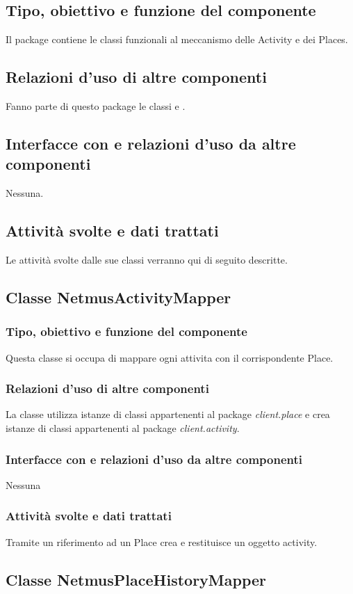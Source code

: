 \subsection*{Tipo, obiettivo e funzione del componente}
Il package contiene le classi funzionali al meccanismo delle Activity e dei
Places.
\subsection*{Relazioni d'uso di altre componenti}
Fanno parte di questo package le classi  e
.
\subsection*{Interfacce con e relazioni d'uso da altre componenti}
Nessuna.
\subsection*{Attivit\`a svolte e dati trattati}
Le attivit\`a svolte dalle sue classi verranno qui di seguito descritte.

\subsection{Classe NetmusActivityMapper}
\subsubsection*{Tipo, obiettivo e funzione del componente}
Questa classe si occupa di mappare ogni attivita con il corrispondente Place.
\subsubsection*{Relazioni d'uso di altre componenti}
La classe utilizza istanze di classi appartenenti al package
\emph{client.place} e crea istanze di classi appartenenti al package
\emph{client.activity}.
\subsubsection*{Interfacce con e relazioni d'uso da altre
componenti} Nessuna
\subsubsection*{Attivit\`a svolte e dati trattati}
Tramite un riferimento ad un Place crea e restituisce un oggetto activity.

\subsection{Classe NetmusPlaceHistoryMapper}
